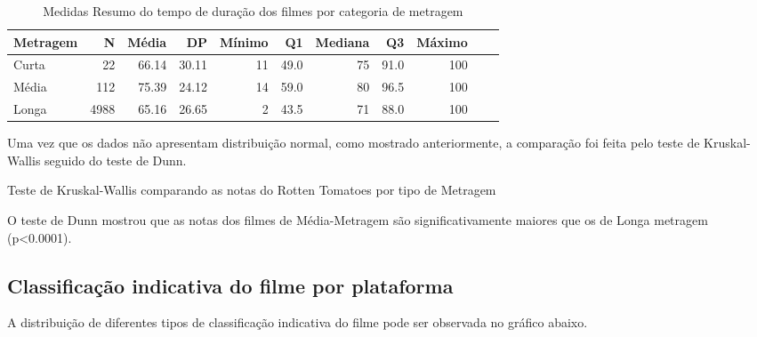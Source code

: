 \documentclass[a4paper, 12pt]{article} %
\begin{document}
\begin{table}[H]
\caption{Medidas Resumo do tempo de duração dos filmes por categoria de metragem}
\centering
\begin{tabular}{l|rrrrrrrrrr}
\hline
\multicolumn{1}{l|}{\textbf{Metragem}} &
\multicolumn{1}{r}{\textbf{N}} &
\multicolumn{1}{r}{\textbf{Média}} &
\multicolumn{1}{r}{\textbf{DP}}&
\multicolumn{1}{r}{\textbf{Mínimo}}&
\multicolumn{1}{r}{\textbf{Q1}}&
\multicolumn{1}{r}{\textbf{Mediana}}&
\multicolumn{1}{r}{\textbf{Q3}}&
\multicolumn{1}{r}{\textbf{Máximo}}\\
\hline

Curta & 22 & 66.14 & 30.11 &  11 & 49.0 & 75 & 91.0 & 100 \\
Média & 112   & 75.39 & 24.12 &  14 & 59.0 & 80 & 96.5 & 100 \\
Longa &  4988  & 65.16 & 26.65 &  2 & 43.5 & 71 & 88.0 & 100  \\
\hline
\end{tabular}
\end{table}

Uma vez que os dados não apresentam distribuição normal, como mostrado anteriormente, a comparação foi feita pelo teste de Kruskal-Wallis seguido do teste de Dunn.


\begin{quadro}[H]
\centering
\caption{Teste de Kruskal-Wallis comparando as notas do Rotten Tomatoes por tipo de Metragem }
\label{R-Q-Teste-1}
\vspace{0.1cm}
\end{quadro}

O teste de Dunn mostrou que as notas dos filmes de Média-Metragem são significativamente maiores que os de Longa metragem (p<0.0001).

\subsection{Classificação indicativa do filme por plataforma}

A distribuição de diferentes tipos de classificação indicativa do filme pode ser observada no gráfico abaixo.
\end{document}
